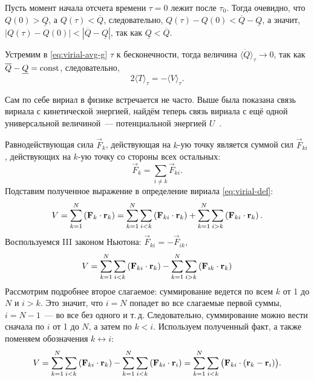 Пусть момент начала отсчета времени $\tau = 0$ лежит после $\tau_0$. Тогда очевидно, что $Q(0) > \underline Q$, а $Q(\tau) < \overline Q$, следовательно, $Q(\tau) - Q(0) < \overline Q - \underline Q$, а значит, $|Q(\tau) - Q(0)| < |\overline Q - \underline Q|$, так как $\underline Q < \overline Q$. 

Устремим в \eqref{eq:virial-avg-g} $\tau$ к бесконечности, тогда величина $\langle \dot{Q} \rangle_\tau  \to 0$, так как $\overline Q - \underline Q = \operatorname{const}$, следовательно,
\begin{equation}
    2\langle T \rangle_\tau = - \langle V \rangle_{\tau}.
    \label{eq:virial-t-v}
\end{equation}

Сам по себе вириал в физике встречается не часто. Выше была показана связь вириала с кинетической энергией, найдём теперь связь вириала с ещё одной универсальной величиной~---  потенциальной энергией $U$~\cite{virial-theorem}.

Равнодействующая сила $\vec F_k$, действующая на $k$-ую точку является суммой сил $\vec F_{ki}$, действующих на $k$-ую точку со стороны всех остальных:
\begin{equation*}
    \vec F_k = \sum_{i \not= k} \vec F_{ki}.
\end{equation*}
Подставим полученное выражение в определение вириала \eqref{eq:virial-def}:
\begin{equation*}
    V = \sum_{k = 1}^N \left(\mathbf{F}_k \cdot \mathbf{r}_k \right)
    = \sum_{k = 1}^N \sum_{i < k} \left(\mathbf{F}_{ki} \cdot \mathbf{r}_k \right)
    + \sum_{k = 1}^N \sum_{i > k} \left(\mathbf{F}_{ki} \cdot \mathbf{r}_k \right).
\end{equation*}
Воспользуемся III законом Ньютона: $\vec F_{ki} = - \vec F_{ik}$,
\begin{equation*}
    V = \sum_{k = 1}^N \sum_{i < k} \left(\mathbf{F}_{ki} \cdot \mathbf{r}_k \right)
    - \sum_{k = 1}^N \sum_{i > k} \left(\mathbf{F}_{ik} \cdot \mathbf{r}_k \right)
\end{equation*}
Рассмотрим подробнее второе слагаемое: суммирование ведется по всем $k$ от 1 до $N$ и $i > k$. Это значит, что $i = N$ попадет во все слагаемые первой суммы, $i = N - 1$~--- во все без одного и т.\,д. Следовательно, суммирование можно вести сначала по $i$ от 1 до $N$, а затем по $k < i$. Используем полученный факт, а также поменяем обозначения $k \leftrightarrow i$:
\begin{equation}
    V = \sum_{k = 1}^N \sum_{i < k} \left(\mathbf{F}_{ki} \cdot \mathbf{r}_k \right)
    - \sum_{k = 1}^N \sum_{i < k} \left(\mathbf{F}_{ki} \cdot \mathbf{r}_i \right)
    = \sum_{k = 1}^N \sum_{i < k} \big( \mathbf{F}_{ki} \cdot (\mathbf{r}_k - \mathbf{r}_i) \big).
    \label{eq:virial-v}
\end{equation}


